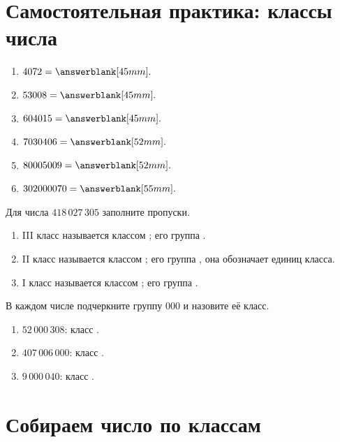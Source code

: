 \section{Самостоятельная практика: классы числа}

\begin{practicebox}
  \begin{enumerate}[label=\textbf{\arabic*.}]
    \item \(4072=\answerblank[45mm].\)
    \item \(53008=\answerblank[45mm].\)
    \item \(604015=\answerblank[45mm].\)
    \item \(7030406=\answerblank[52mm].\)
    \item \(80005009=\answerblank[52mm].\)
    \item \(302000070=\answerblank[55mm].\)
  \end{enumerate}
\end{practicebox}

\begin{practicebox}
  Для числа \(418\,027\,305\) заполните пропуски.
  \begin{enumerate}[label=\textbf{\arabic*.}]
    \item III класс называется классом \answerblank[25mm]; его группа
      \answerblank[18mm].
    \item II класс называется классом \answerblank[25mm]; его группа
      \answerblank[18mm], она обозначает \answerblank[18mm] единиц класса.
    \item I класс называется классом \answerblank[25mm]; его группа
      \answerblank[18mm].
  \end{enumerate}
\end{practicebox}

\begin{practicebox}
  В каждом числе подчеркните группу \(000\) и назовите её класс.
  \begin{enumerate}[label=\textbf{\arabic*.}]
    \item \(52\,000\,308\): класс \answerblank[25mm].
    \item \(407\,006\,000\): класс \answerblank[25mm].
    \item \(9\,000\,040\): класс \answerblank[25mm].
  \end{enumerate}
\end{practicebox}

\section{Собираем число по классам}

